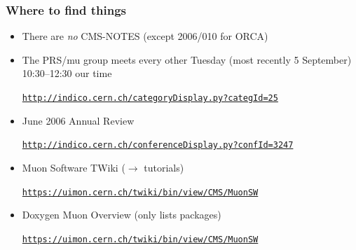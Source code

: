 \documentclass[12pt,compress]{beamer}
\begin{document}
\begin{frame}
\frametitle{Where to find things}

\begin{itemize}\setlength{\itemsep}{0.25 cm}
\item There are {\it no} CMS-NOTES (except 2006/010 for ORCA)

\item The PRS/mu group meets every other Tuesday (most recently 5 September) 10:30--12:30 our time

{\tt \scriptsize \href{http://indico.cern.ch/categoryDisplay.py?categId=25}{http://indico.cern.ch/categoryDisplay.py?categId=25}}

\item June 2006 Annual Review

{\tt \scriptsize \href{http://indico.cern.ch/conferenceDisplay.py?confId=3247}{http://indico.cern.ch/conferenceDisplay.py?confId=3247}}

\item Muon Software TWiki ($\rightarrow$ tutorials)

{\tt \scriptsize \href{https://uimon.cern.ch/twiki/bin/view/CMS/MuonSW}{https://uimon.cern.ch/twiki/bin/view/CMS/MuonSW}}

\item Doxygen Muon Overview (only lists packages)

{\tt \scriptsize \href{https://uimon.cern.ch/twiki/bin/view/CMS/MuonSW}{https://uimon.cern.ch/twiki/bin/view/CMS/MuonSW}}

\end{itemize}
\label{numpages}
\end{frame}
\end{document}
